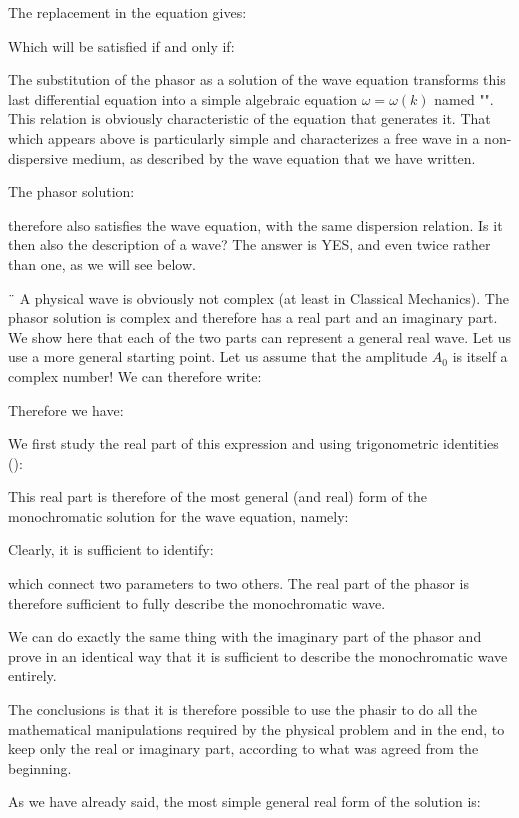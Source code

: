 	The replacement in the equation gives:
	
	Which will be satisfied if and only if:
	
	The substitution of the phasor as a solution of the wave equation transforms this last differential equation into a simple algebraic equation  $\omega=\omega(k)$ named "". This relation is obviously characteristic of the equation that generates it. That which appears above is particularly simple and characterizes a free wave in a non-dispersive medium, as described by the wave equation that we have written.

	The phasor solution:
	
	therefore also satisfies the wave equation, with the same dispersion relation. Is it then also the description of a wave? The answer is YES, and even twice rather than one, as we will see below.

¨	A physical wave is obviously not complex (at least in Classical Mechanics). The phasor solution is complex and therefore has a real part and an imaginary part. We show here that each of the two parts can represent a general real wave. Let us use a more general starting point. Let us assume that the amplitude $A_0$ is itself a complex number! We can therefore write:
	
	Therefore we have:
	
	We first study the real part of this expression and using trigonometric identities ():
	
	This real part is therefore of the most general (and real) form of the monochromatic solution for the wave equation, namely:
	
	Clearly, it is sufficient to identify:
	
	which connect two parameters to two others. The real part of the phasor is therefore sufficient to fully describe the monochromatic wave.

	We can do exactly the same thing with the imaginary part of the phasor and prove in an identical way that it is sufficient to describe the monochromatic wave entirely.

	The conclusions is that it is therefore possible to use the phasir to do all the mathematical manipulations required by the physical problem and in the end, to keep only the real or imaginary part, according to what was agreed from the beginning.

	As we have already said, the most simple general real form of the solution is:
	
